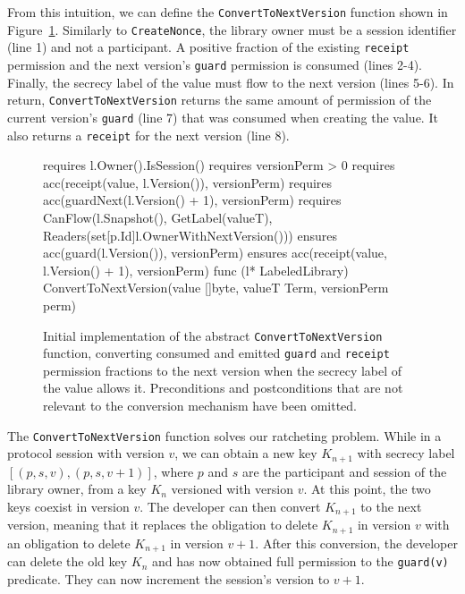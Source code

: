 From this intuition, we can define the \texttt{ConvertToNextVersion} function shown in Figure~\ref{lst:convert-to-next-version}.
Similarly to \texttt{CreateNonce}, the library owner must be a session identifier (line 1) and not a participant. A positive fraction of the existing \texttt{receipt} permission and the next version's \texttt{guard} permission is consumed (lines 2-4). Finally, the secrecy label of the value must flow to the next version (lines 5-6).
In return, \texttt{ConvertToNextVersion} returns the same amount of permission of the current version's \texttt{guard} (line 7) that was consumed when creating the value. It also returns a \texttt{receipt} for the next version (line 8).

\begin{figure}
    \begin{gobra}
requires l.Owner().IsSession()
requires versionPerm > 0
requires acc(receipt(value, l.Version()), versionPerm)
requires acc(guardNext(l.Version() + 1), versionPerm)
requires CanFlow(l.Snapshot(), GetLabel(valueT),
    Readers(set[p.Id]{l.OwnerWithNextVersion()}))
ensures  acc(guard(l.Version()), versionPerm)
ensures  acc(receipt(value, l.Version() + 1), versionPerm)
func (l* LabeledLibrary) ConvertToNextVersion(value []byte,
    valueT Term, versionPerm perm)
    \end{gobra}
    \caption{Initial implementation of the abstract \texttt{ConvertToNextVersion} function, converting consumed and emitted \texttt{guard} and \texttt{receipt} permission fractions to the next version when the secrecy label of the value allows it. Preconditions and postconditions that are not relevant to the conversion mechanism have been omitted.}
    \label{lst:convert-to-next-version}
\end{figure}

The \texttt{ConvertToNextVersion} function solves our ratcheting problem. While in a protocol session with version $v$, we can obtain a new key $K_{n+1}$ with secrecy label $[(p,s,v), (p,s,v+1)]$, where $p$ and $s$ are the participant and session of the library owner, from a key $K_n$ versioned with version $v$. At this point, the two keys coexist in version $v$.
The developer can then convert $K_{n+1}$ to the next version, meaning that it replaces the obligation to delete $K_{n+1}$ in version $v$ with an obligation to delete $K_{n+1}$ in version $v+1$.
After this conversion, the developer can delete the old key $K_n$ and has now obtained full permission to the \texttt{guard(v)} predicate. They can now increment the session's version to $v+1$.

